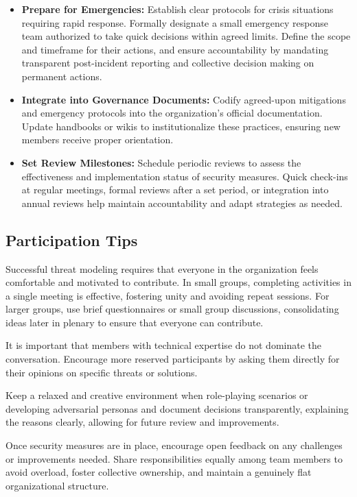 \begin{itemize}
    \item \textbf{Prepare for Emergencies:} Establish clear protocols for crisis
    situations requiring rapid response. Formally designate a small emergency
    response team authorized to take quick decisions within agreed limits. Define
    the scope and timeframe for their actions, and ensure accountability by
    mandating transparent post-incident reporting and collective decision making on
    permanent actions.
    
    \item \textbf{Integrate into Governance Documents:} Codify agreed-upon
    mitigations and emergency protocols into the organization's official
    documentation. Update handbooks or wikis to institutionalize these practices,
    ensuring new members receive proper orientation.
    
    \item \textbf{Set Review Milestones:} Schedule periodic reviews to assess the
    effectiveness and implementation status of security measures. Quick check-ins at
    regular meetings, formal reviews after a set period, or integration into annual
    reviews help maintain accountability and adapt strategies as needed.
    
\end{itemize}

\subsection{Participation Tips}
\label{subsec:participation_tips}

Successful threat modeling requires that everyone in the organization feels comfortable
and motivated to contribute. In small groups, completing activities in a single meeting is
effective, fostering unity and avoiding repeat sessions. For larger groups, use
brief questionnaires or small group discussions, consolidating ideas later in
plenary to ensure that everyone can contribute.

It is important that members with technical expertise do not dominate the
conversation. Encourage more reserved participants by asking them directly for
their opinions on specific threats or solutions.

Keep a relaxed and creative environment when role-playing scenarios or
developing adversarial personas and document decisions transparently,
explaining the reasons clearly, allowing for future review and improvements.

Once security measures are in place, encourage open feedback on any challenges
or improvements needed. Share responsibilities equally among team members to
avoid overload, foster collective ownership, and maintain a genuinely flat
organizational structure.

